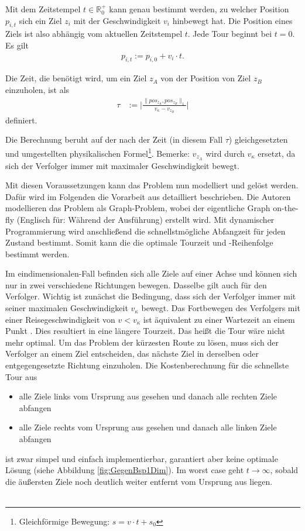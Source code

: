 \documentclass[german,version-2019-11]{uzl-thesis}
\begin{document}
\begin{definition}
\label{def:UpdatedPos}
Mit dem Zeitstempel $t\in \mathbb{R}^+_0$ kann genau bestimmt werden, zu welcher Position $p_{i,t}$ sich ein Ziel $z_i$ mit der Geschwindigkeit $v_i$ hinbewegt hat. Die Position eines Ziels ist also abhängig vom aktuellen Zeitstempel $t$. Jede Tour beginnt bei $t=0$. Es gilt
\begin{align*}
p_{i,t} := p_{i,0} + v_i\cdot t.
\end{align*} 
\end{definition}

\begin{definition}
\label{def:WegZeit}
Die Zeit, die benötigt wird, um ein Ziel $z_A$ von der Position von Ziel $z_B$ einzuholen, ist als
\begin{align*}
\tau &:= \bigg\vert\frac{\|pos_{z_A},pos_{z_B}\|_1}{v_{\kappa}-v_{z_B}}\bigg\vert
\end{align*} 
definiert.
\end{definition}\noindent
Die Berechnung beruht auf der nach der Zeit (in diesem Fall $\tau$) gleichgesetzten und umgestellten physikalischen Formel\footnote{Gleichförmige Bewegung: $s=v\cdot t+s_0$}.
Bemerke: $v_{z_A}$ wird durch $v_{\kappa}$ ersetzt, da sich der Verfolger immer mit maximaler Geschwindigkeit bewegt.

Mit diesen Voraussetzungen kann das Problem nun modelliert und gelöst werden. Dafür wird im Folgenden die Vorarbeit aus \cite{helvig} detailliert beschrieben. Die Autoren modellieren das Problem als Graph-Problem, wobei der eigentliche Graph on-the-fly (Englisch für: Während der Ausführung) erstellt wird. Mit dynamischer Programmierung wird anschließend die schnellstmögliche Abfangzeit für jeden Zustand bestimmt. Somit kann die die optimale Tourzeit und -Reihenfolge bestimmt werden.

Im eindimensionalen-Fall befinden sich alle Ziele auf einer Achse und können sich nur in zwei verschiedene Richtungen bewegen. Dasselbe gilt auch für den Verfolger. Wichtig ist zunächst die Bedingung, dass sich der Verfolger immer mit seiner maximalen Geschwindigkeit $v_{\kappa}$ bewegt. Das Fortbewegen des Verfolgers mit einer Reisegeschwindigkeit von $v<v_{\kappa}$ ist äquivalent zu einer Wartezeit an einem Punkt  \cite{helvig}. Dies resultiert in eine längere Tourzeit. Das heißt die Tour wäre nicht mehr optimal.
Um das Problem der kürzesten Route zu lösen, muss sich der Verfolger an einem Ziel entscheiden, das nächste Ziel in derselben oder entgegengesetzte Richtung einzuholen. Die Kostenberechnung für die schnellste Tour aus
\begin{itemize}
\item alle Ziele links vom Ursprung aus gesehen und danach alle rechten Ziele abfangen
\item alle Ziele rechts vom Ursprung aus gesehen und danach alle linken Ziele abfangen
\end{itemize} 
ist zwar simpel und einfach implementierbar, garantiert aber keine optimale Lösung (siehe Abbildung \ref{fig:GegenBsp1Dim}). Im worst case geht $t\rightarrow\infty$, sobald die äußersten Ziele noch deutlich weiter entfernt vom Ursprung aus liegen. \\~\\
\end{document}
